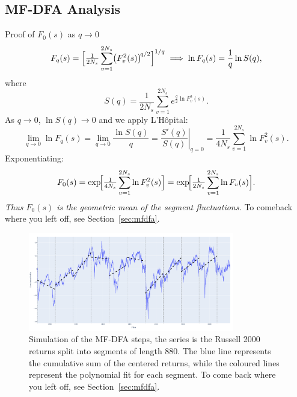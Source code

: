 \documentclass[11pt]{extarticle}
\begin{document}
\subsection{MF-DFA Analysis}

\label{sec:proof_F0}
\begin{frame}{Proof of \(F_0(s)\) as \(q\to0\)}
  \[
    F_q(s)
    =\Bigl[\tfrac{1}{2N_s}\sum_{v=1}^{2N_s}\bigl(F_v^2(s)\bigr)^{\!q/2}\Bigr]^{1/q}
    \;\Longrightarrow\;
    \ln F_q(s)
    =\frac{1}{q}\ln S(q),
  \]
  where
  \[
    S(q)=\frac{1}{2N_s}\sum_{v=1}^{2N_s}e^{\tfrac{q}{2}\ln F_v^2(s)}.
  \]
  As \(q\to0\), \(\ln S(q)\to0\) and we apply L’Hôpital:
  \[
    \lim_{q\to0}\ln F_q(s)
    =\lim_{q\to0}\frac{\ln S(q)}{q}
    =\left.\frac{S'(q)}{S(q)}\right|_{q=0}
    =\frac{1}{4N_s}\sum_{v=1}^{2N_s}\ln F_v^2(s).
  \]
  Exponentiating:
  \[
    F_0(s)
    =\exp\!\Bigl[\tfrac{1}{4N_s}\sum_{v=1}^{2N_s}\ln F_v^2(s)\Bigr]
    =\exp\!\Bigl[\tfrac{1}{2N_s}\sum_{v=1}^{2N_s}\ln F_v(s)\Bigr].
  \]
  \vspace{4pt}
  \textit{Thus \(F_0(s)\) is the geometric mean of the segment fluctuations.}
    To comeback where you left off, see Section~\ref{sec:mfdfa}.
\end{frame}

\begin{figure}[ht]
    \centering
    \includegraphics[width=0.8\textwidth]{img/cumulative_profile_segment_partitioning}
    \caption{Simulation of the MF-DFA steps, the series is the Russell 2000 returns
    split into segments of length 880.
        The blue line represents the cumulative sum of the centered returns, while the coloured lines represent the polynomial fit for
    each segment. To come back where you left off, see Section~\ref{sec:mfdfa}.}
    \label{fig:cumulative_profile_segment_partitioning}
\end{figure}
\FloatBarrier
\end{document}

